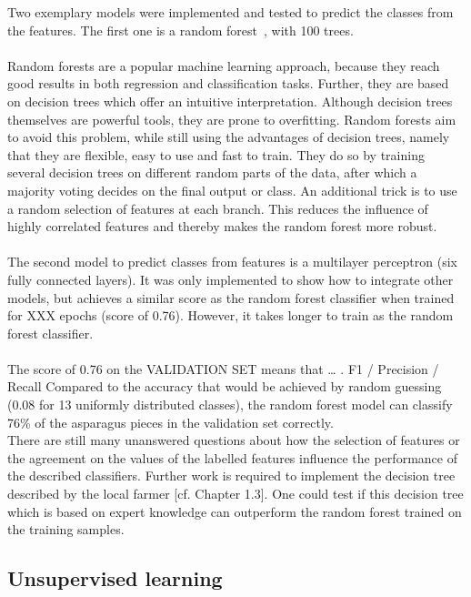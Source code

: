Two exemplary models were implemented and tested to predict the classes from the features. The first one is a random forest~\citep{breiman2001random}, with 100 trees. \\
\\
Random forests are a popular machine learning approach, because they reach good results in both regression and classification tasks. Further, they are based on decision trees which offer an intuitive interpretation. Although decision trees themselves are powerful tools, they are prone to overfitting. Random forests aim to avoid this problem, while still using the advantages of decision trees, namely that they are flexible, easy to use and fast to train. They do so by training several decision trees on different random parts of the data, after which a majority voting decides on the final output or class. An additional trick is to use a random selection of features at each branch. This reduces the influence of highly correlated features and thereby makes the random forest more robust. \\
\\
The second model to predict classes from features is a multilayer perceptron (six fully connected layers). It was only implemented to show how to integrate other models, but achieves a similar score as the random forest classifier when trained for XXX epochs (score of 0.76). However, it takes longer to train as the random forest classifier. \\
\\
The score of 0.76 on the VALIDATION SET means that  … . F1 / Precision / Recall Compared to the accuracy that would be achieved by random guessing (0.08 for 13 uniformly distributed classes), the random forest model can classify 76\% of the asparagus pieces in the validation set correctly. \\
There are still many unanswered questions about how the selection of features or the agreement on the values of the labelled features influence the performance of the described classifiers. Further work is required to implement the decision tree described by the local farmer [cf. Chapter 1.3]. One could test if this decision tree which is based on expert knowledge can outperform the random forest trained on the training samples. 



\subsection{Unsupervised learning}

